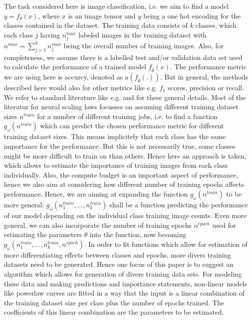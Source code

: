 \documentclass{article} %
\begin{document}
The task considered here is image classification, i.e. we aim to find a model $y = f_{\theta}(x)$, where $x$ is an image tensor and $y$ being a one hot encoding for the classes contained in the dataset.
The training data consists of $k$ classes, which each class $j$ having $n_j^{max}$ labeled images in the training dataset with $n^{max} = \sum_{j= 1}^k n_j^{max}$ being the overall number of training images.
Also, for completeness, we assume there is a labelled test and/or validation data set used to calculate the performance of a trained model $f_{\hat{\theta}}(x)$.
The performance metric we are using here is accurcy, denoted as $a(f_{\hat{\theta}}(.))$. But in general, the methods described here would also for other metrics like e.g. $f_1$ scores, precision or recall.
We refer to standard literature like e.g. \cite{Goodfellowetal2016} and \cite{Bishop2006PatternRecog} for these general details.
Most of the literatur for neural scaling laws focusses on assuming different training dataset sizes $n^{train}$ for a number of different training jobs, i.e. to find a function $g_{\omega}(n^{train})$ which can predict the chosen performance metric for different training dataset sizes.
This means implicitely that each class has the same importance for the performance.
But this is not necessarily true, some classes might be more difficult to train on than others.
Hence here an approach is taken, which allows to estimate the importance of training images from each class individually.
Also, the compute budget is an important aspect of performance, hence we also aim at considering how different number of training epochs affects performance.
Hence, we are aiming at expanding the function $g_{\omega}(n^{train})$ to be more general: $g_{\omega}(n_1^{train}, \dots, n_k^{train})$ shall be a function predicting the performance of our model depending on the individual class training image counts.
Even more general, we can also incorporate the number of training epochs $n^{epoch}$ used for estimating the parameters $\theta$ into the function, now becoming $g_{\omega}(n_1^{train}, \dots, n_k^{train}, n^{epoch})$.
In order to fit functions which allow for estimation of more differentiating effects between classes and epochs, more divers training datasets need to be generated.
Hence one focus of this paper is to suggest an algorithm which allows for generation of divers training data sets.
For modeling these data and making predictions and importance statements, non-linear models like powerlaw curves are fitted in a way that the input is a linear combination of the training dataset size per class plus the number of epochs trained.
The coefficients of this linear combination are the parameters to be estimated.
\end{document}
